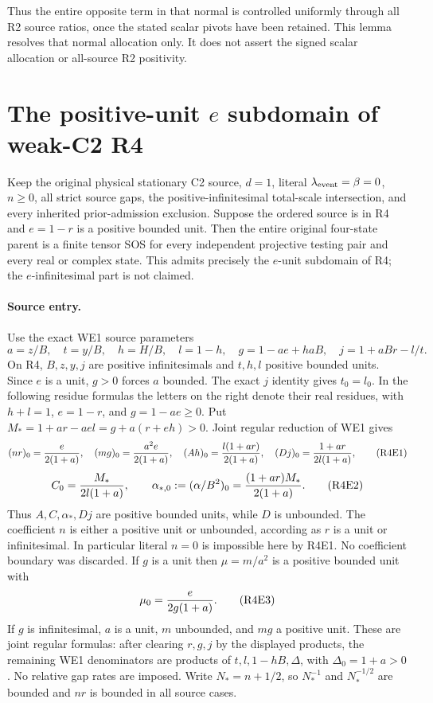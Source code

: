 Thus the entire opposite term in that normal is controlled
uniformly through all R2 source ratios, once the stated scalar
pivots have been retained.  This lemma resolves that normal
allocation only.  It does not assert the signed scalar allocation
or all-source R2 positivity.



\section{\texorpdfstring{The positive-unit $e$ subdomain of weak-C2 R4}{The positive-unit e subdomain of weak-C2 R4}}
\label{component:p78dfeedee062}

\label{p78dfeedee062:sec:r17-r4-eunit}

\begin{theorem}
Keep the original physical stationary C2 source, $d=1$, literal
$\lambda_{\rm event}=\beta=0$, $n\ge0$, all strict source gaps, the
positive-infinitesimal total-scale intersection, and every inherited
prior-admission exclusion. Suppose the ordered source is in R4 and
$e=1-r$ is a positive bounded unit. Then the entire original four-state
parent is a finite tensor SOS for every independent projective testing
pair and every real or complex state. This admits precisely the
$e$-unit subdomain of R4; the $e$-infinitesimal part is not claimed.
\end{theorem}

\paragraph{Source entry.}
Use the exact WE1 source parameters
\[
 a=z/B,\quad t=y/B,\quad h=H/B,\quad l=1-h,
 \quad g=1-ae+haB,\quad j=1+aBr-l/t.
\]
On R4, $B,z,y,j$ are positive infinitesimals and $t,h,l$ positive
bounded units. Since $e$ is a unit, $g>0$ forces $a$ bounded.
The exact $j$ identity gives $t_0=l_0$. In the following residue
formulas the letters on the right denote their real residues, with
$h+l=1$, $e=1-r$, and $g=1-ae\ge0$. Put
$M_*=1+ar-ael=g+a(r+eh)>0$. Joint regular reduction of WE1 gives
\[
 (nr)_0={e\over2(1+a)},\quad
 (mg)_0={a^2e\over2(1+a)},\quad
 (Ah)_0={l(1+ar)\over2(1+a)},\quad
 (Dj)_0={1+ar\over2l(1+a)},                         \tag{R4E1}
\]
\[
 C_0={M_*\over2l(1+a)},\qquad
 \alpha_{*,0}:=(\alpha/B^2)_0={(1+ar)M_*\over2(1+a)}.\tag{R4E2}
\]
Thus $A,C,\alpha_*,Dj$ are positive bounded units, while $D$ is
unbounded. The coefficient $n$ is either a positive unit or unbounded,
according as $r$ is a unit or infinitesimal. In particular literal
$n=0$ is impossible here by R4E1. No coefficient boundary was discarded.
If $g$ is a unit then $\mu=m/a^2$ is a positive bounded unit with
\[
                 \mu_0={e\over2g(1+a)}.              \tag{R4E3}
\]
If $g$ is infinitesimal, $a$ is a unit, $m$ unbounded, and $mg$ a
positive unit. These are joint regular formulas: after clearing $r,g,j$
by the displayed products, the remaining WE1 denominators are products
of $t,l,1-hB,\Delta$, with $\Delta_0=1+a>0$. No relative gap rates
are imposed. Write $N_*=n+1/2$, so $N_*^{-1}$ and $N_*^{-1/2}$ are
bounded and $nr$ is bounded in all source cases.

